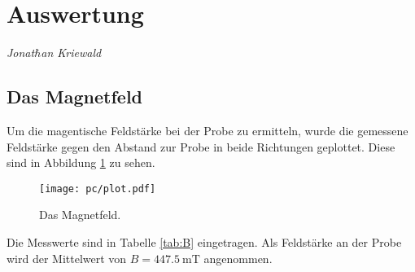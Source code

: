 \section{Auswertung}
\label{sec:Auswertung}
{\footnotesize \textit{Jonat$\hbar$an Kriewald}}

\subsection{Das Magnetfeld}
Um die magentische Feldstärke bei der Probe zu ermitteln, wurde die gemessene Feldstärke gegen den Abstand zur Probe in beide Richtungen geplottet.
Diese sind in Abbildung \ref{fig:plot} zu sehen.
\begin{figure}
  \centering
  \texttt{[image: pc/plot.pdf]}
  \caption{Das Magnetfeld.}
  \label{fig:plot}
\end{figure}
Die Messwerte sind in Tabelle \ref{tab:B} eingetragen.
Als Feldstärke an der Probe wird der Mittelwert von $B = \SI{447.5}{\milli\tesla}$ angenommen.

